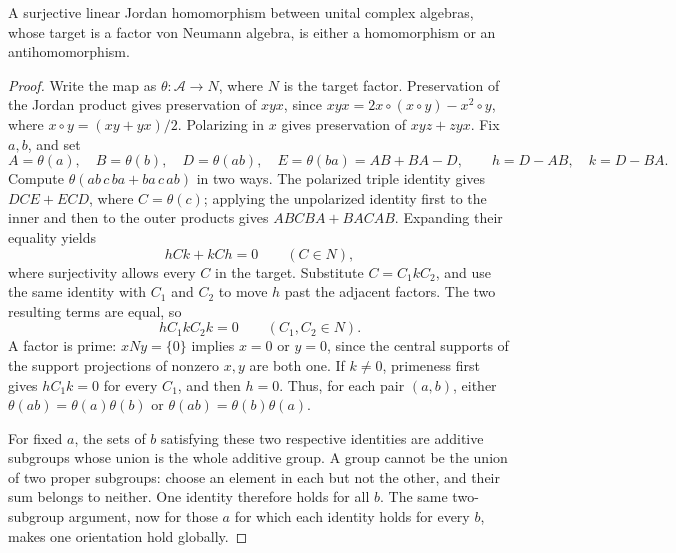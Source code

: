 \begin{lemma}
\label{lem:jordan-orientation}
A surjective linear Jordan homomorphism between unital complex algebras,
whose target is a factor von Neumann algebra, is either a homomorphism
or an antihomomorphism.
\end{lemma}
\begin{proof}
Write the map as $\theta:\mathcal A\to N$, where $N$ is the target factor.
Preservation of the Jordan product gives
preservation of $xyx$, since
$xyx=2x\circ(x\circ y)-x^2\circ y$, where
$x\circ y=(xy+yx)/2$.  Polarizing in $x$ gives preservation of
$xyz+zyx$.  Fix $a,b$, and set
\[
 A=\theta(a),\quad B=\theta(b),\quad D=\theta(ab),\quad
 E=\theta(ba)=AB+BA-D,
 \qquad h=D-AB,\quad k=D-BA.
\]
Compute $\theta(ab\,c\,ba+ba\,c\,ab)$ in two ways.  The polarized
triple identity gives $DCE+ECD$, where $C=\theta(c)$; applying the
unpolarized identity first to the inner and then to the outer products
gives $ABCBA+BACAB$.  Expanding their equality yields
\[
 hCk+kCh=0\qquad(C\in N),
\]
where surjectivity allows every $C$ in the target.  Substitute
$C=C_1kC_2$, and use the same identity with $C_1$ and $C_2$ to move
$h$ past the adjacent factors.  The two resulting terms are equal, so
\[
 hC_1kC_2k=0\qquad(C_1,C_2\in N).
\]
A factor is prime: $xNy=\{0\}$ implies $x=0$ or $y=0$, since the
central supports of the support projections of nonzero $x,y$ are both
one.  If $k\ne0$, primeness first gives $hC_1k=0$ for every $C_1$,
and then $h=0$.  Thus, for each pair $(a,b)$, either
$\theta(ab)=\theta(a)\theta(b)$ or
$\theta(ab)=\theta(b)\theta(a)$.

For fixed $a$, the sets of $b$ satisfying these two respective identities
are additive subgroups whose union is the whole additive group.  A group
cannot be the union of two proper subgroups: choose an element in each
but not the other, and their sum belongs to neither.  One identity
therefore holds for all $b$.  The same two-subgroup argument, now for
those $a$ for which each identity holds for every $b$, makes one
orientation hold globally.
\end{proof}

